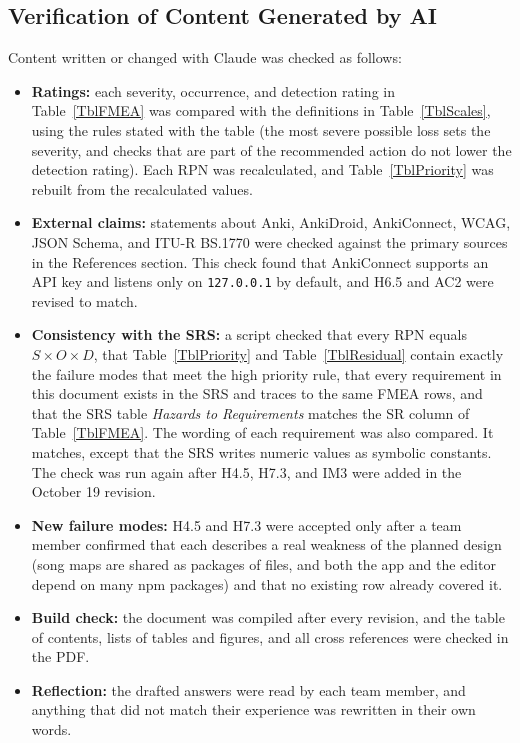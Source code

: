 \documentclass{article}
\begin{document}
\subsection{Verification of Content Generated by AI}

Content written or changed with Claude was checked as follows:

\begin{itemize}
  \item \textbf{Ratings:} each severity, occurrence, and detection rating in
        Table~\ref{TblFMEA} was compared with the definitions in
        Table~\ref{TblScales}, using the rules stated with the table (the most
        severe possible loss sets the severity, and checks that are part of
        the recommended action do not lower the detection rating). Each RPN
        was recalculated, and Table~\ref{TblPriority} was rebuilt from the
        recalculated values.
  \item \textbf{External claims:} statements about Anki, AnkiDroid,
        AnkiConnect, WCAG, JSON Schema, and ITU-R BS.1770 were checked against
        the primary sources in the References section. This check found that
        AnkiConnect supports an API key and listens only on
        \texttt{127.0.0.1} by default, and H6.5 and AC2 were revised to match.
  \item \textbf{Consistency with the SRS:} a script checked that every RPN
        equals $S \times O \times D$, that Table~\ref{TblPriority} and
        Table~\ref{TblResidual} contain exactly the failure modes that meet the
        high priority rule, that every requirement in this document exists in
        the SRS and traces to the same FMEA rows, and that the SRS table
        \emph{Hazards to Requirements} matches the SR column of
        Table~\ref{TblFMEA}. The wording of each requirement was also
        compared. It matches, except that the SRS writes numeric values as
        symbolic constants. The check was run again after H4.5, H7.3, and IM3
        were added in the October 19 revision.
  \item \textbf{New failure modes:} H4.5 and H7.3 were accepted only after a
        team member confirmed that each describes a real weakness of the
        planned design (song maps are shared as packages of files, and both
        the app and the editor depend on many npm packages) and that no
        existing row already covered it.
  \item \textbf{Build check:} the document was compiled after every revision,
        and the table of contents, lists of tables and figures, and all
        cross references were checked in the PDF.
  \item \textbf{Reflection:} the drafted answers were read by each team member,
        and anything that did not match their experience was rewritten in
        their own words.
\end{itemize}
\end{document}
